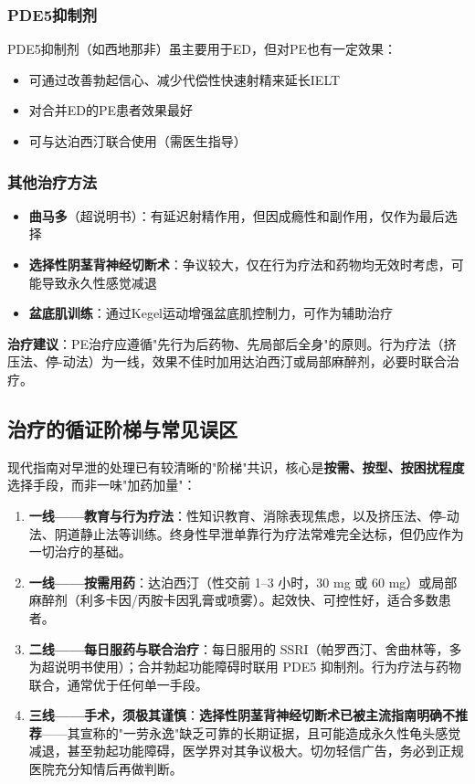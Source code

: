 \subsubsection{PDE5抑制剂}

PDE5抑制剂（如西地那非）虽主要用于ED，但对PE也有一定效果：
\begin{itemize}[leftmargin=2cm]
	\item 可通过改善勃起信心、减少代偿性快速射精来延长IELT
	\item 对合并ED的PE患者效果最好
	\item 可与达泊西汀联合使用（需医生指导）
\end{itemize}

\subsubsection{其他治疗方法}

\begin{itemize}[leftmargin=2cm]
	\item \textbf{曲马多}（超说明书）：有延迟射精作用，但因成瘾性和副作用，仅作为最后选择
	\item \textbf{选择性阴茎背神经切断术}：争议较大，仅在行为疗法和药物均无效时考虑，可能导致永久性感觉减退
	\item \textbf{盆底肌训练}：通过Kegel运动增强盆底肌控制力，可作为辅助治疗
\end{itemize}

\textbf{治疗建议}：PE治疗应遵循"先行为后药物、先局部后全身"的原则。行为疗法（挤压法、停-动法）为一线，效果不佳时加用达泊西汀或局部麻醉剂，必要时联合治疗。

\subsection{治疗的循证阶梯与常见误区}

现代指南对早泄的处理已有较清晰的"阶梯"共识，核心是\textbf{按需、按型、按困扰程度}选择手段，而非一味"加药加量"：

\begin{enumerate}
	\item \textbf{一线——教育与行为疗法}：性知识教育、消除表现焦虑，以及挤压法、停-动法、阴道静止法等训练。终身性早泄单靠行为疗法常难完全达标，但仍应作为一切治疗的基础。
	\item \textbf{一线——按需用药}：达泊西汀（性交前 1--3 小时，30 mg 或 60 mg）或局部麻醉剂（利多卡因/丙胺卡因乳膏或喷雾）。起效快、可控性好，适合多数患者。
	\item \textbf{二线——每日服药与联合治疗}：每日服用的 SSRI（帕罗西汀、舍曲林等，多为超说明书使用）；合并勃起功能障碍时联用 PDE5 抑制剂。行为疗法与药物联合，通常优于任何单一手段。
	\item \textbf{三线——手术，须极其谨慎}：\textbf{选择性阴茎背神经切断术已被主流指南明确不推荐}——其宣称的"一劳永逸"缺乏可靠的长期证据，且可能造成永久性龟头感觉减退，甚至勃起功能障碍，医学界对其争议极大。切勿轻信广告，务必到正规医院充分知情后再做判断。
\end{enumerate}

